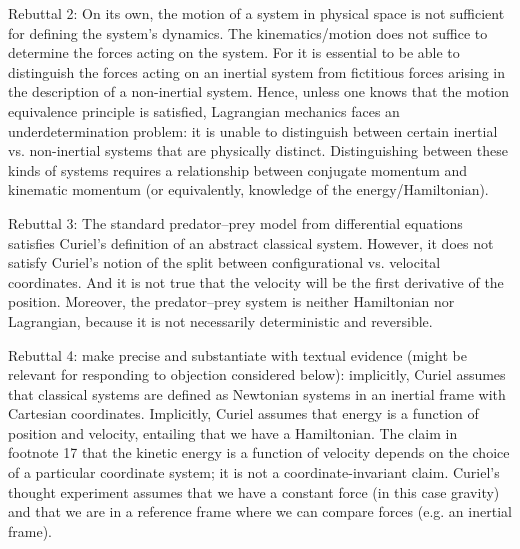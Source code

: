 \documentclass[letterpaper]{article}
\begin{document}

Rebuttal 2: On its own, the motion of a system in physical space is not sufficient for defining the system's dynamics. The kinematics/motion does not suffice to determine the forces acting on the system. For it is essential to be able to distinguish the forces acting on an inertial system from fictitious forces arising in the description of a non-inertial system. Hence, unless one knows that the motion equivalence principle is satisfied, Lagrangian mechanics faces an underdetermination problem: it is unable to distinguish between certain inertial vs. non-inertial systems that are physically distinct. Distinguishing between these kinds of systems requires a relationship between conjugate momentum and kinematic momentum (or equivalently, knowledge of the energy/Hamiltonian).

Rebuttal 3: The standard predator--prey model from differential equations satisfies Curiel's definition of an abstract classical system. However, it does not satisfy Curiel's notion of the split between configurational vs. velocital coordinates. And it is not true that the velocity will be the first derivative of the position. Moreover, the predator--prey system is neither Hamiltonian nor Lagrangian, because it is not necessarily deterministic and reversible.

Rebuttal 4: make precise and substantiate with textual evidence (might be relevant for responding to objection considered below): implicitly, Curiel assumes that classical systems are defined as Newtonian systems in an inertial frame with Cartesian coordinates. Implicitly, Curiel assumes that energy is a function of position and velocity, entailing that we have a Hamiltonian. The claim in footnote 17 that the kinetic energy is a function of velocity depends on the choice of a particular coordinate system; it is not a coordinate-invariant claim. Curiel's thought experiment assumes that we have a constant force (in this case gravity) and that we are in a reference frame where we can compare forces (e.g. an inertial frame).
\end{document}
